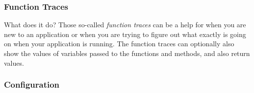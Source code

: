 \begin{frame}\frametitle{Function Traces}
    \begin{block}{What does it do?}
        Those so-called \emph{function traces} can be a help for when you are new to an application or when you are trying to figure out what exactly is going on when your application is running. The function traces can optionally also show the values of variables passed to the functions and methods, and also return values.
    \end{block}
\end{frame}

\begin{frame}\frametitle{Configuration}
    
\end{frame}
